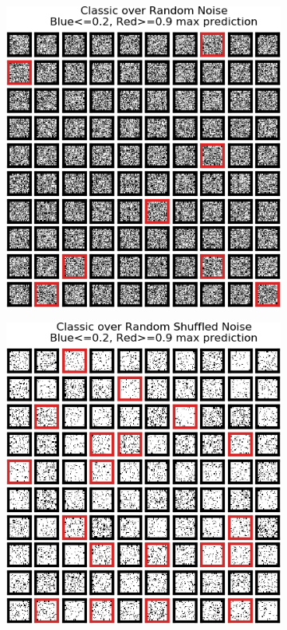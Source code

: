 \documentclass[12pt,oneside]{CUNY_PhD}
\begin{document}
\begin{figure}[!htbp]
    \centering
    \begin{subfigure}[t]{0.49\textwidth}
        \includegraphics[width=\textwidth]{images/mnist-behavior/classic-pred-random.png}
    \end{subfigure}
    \begin{subfigure}[t]{0.49\textwidth}
        \includegraphics[width=\textwidth]{images/mnist-behavior/classic-pred-shuffled.png}

\end{subfigure}
\end{figure}
\end{document}
